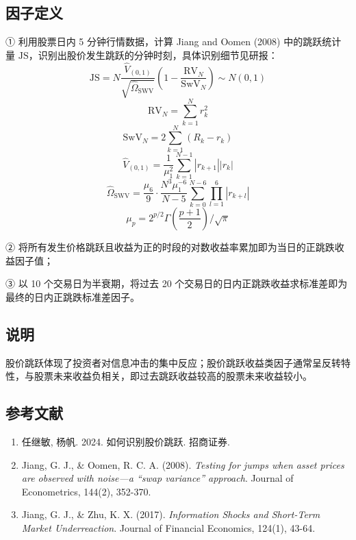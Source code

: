 \documentclass{article}
\begin{document}
\subsection{因子定义}

① 利用股票日内 5 分钟行情数据，计算 Jiang and Oomen (2008) 中的跳跃统计量 \( \mathrm{JS} \)，识别出股价发生跳跃的分钟时刻，具体识别细节见研报：
\begin{equation}
    \mathrm{JS} = N \frac{\hat{V}_{(0,1)}}{\sqrt{\hat{\Omega}_{\mathrm{SWV}}}} \left( 1 - \frac{\mathrm{RV}_N}{\mathrm{SwV}_N} \right) \sim N(0,1)
\end{equation}
\begin{equation}
    \mathrm{RV}_N = \sum_{k=1}^{N} r_k^2
\end{equation}
\begin{equation}
    \mathrm{SwV}_N = 2 \sum_{k=1}^{N} (R_k - r_k)
\end{equation}
\begin{equation}
    \hat{V}_{(0,1)} = \frac{1}{\mu_1^2} \sum_{k=1}^{N-1} |r_{k+1}| |r_k|
\end{equation}
\begin{equation}
    \hat{\Omega}_{\mathrm{SWV}} = \frac{\mu_6}{9} \cdot \frac{N^3 \mu_1^{-6}}{N - 5} \sum_{k=0}^{N-6} \prod_{l=1}^{6} |r_{k+l}|
\end{equation}
\begin{equation}
    \mu_p = 2^{p/2} \Gamma \left( \frac{p+1}{2} \right) / \sqrt{\pi}
\end{equation}

② 将所有发生价格跳跃且收益为正的时段的对数收益率累加即为当日的正跳跌收益因子值；

③ 以 10 个交易日为半衰期，将过去 20 个交易日的日内正跳跌收益求标准差即为最终的日内正跳跌标准差因子。

\subsection{说明}
股价跳跃体现了投资者对信息冲击的集中反应；股价跳跃收益类因子通常呈反转特性，与股票未来收益负相关，即过去跳跃收益较高的股票未来收益较小。

\subsection{参考文献}
\begin{enumerate}
    \item 任继敏, 杨帆. 2024. 如何识别股价跳跃. 招商证券.
    \item Jiang, G. J., \& Oomen, R. C. A. (2008). \textit{Testing for jumps when asset prices are observed with noise—a “swap variance” approach}. Journal of Econometrics, 144(2), 352-370.
    \item Jiang, G. J., \& Zhu, K. X. (2017). \textit{Information Shocks and Short-Term Market Underreaction}. Journal of Financial Economics, 124(1), 43-64.
\end{enumerate}
\end{document}
